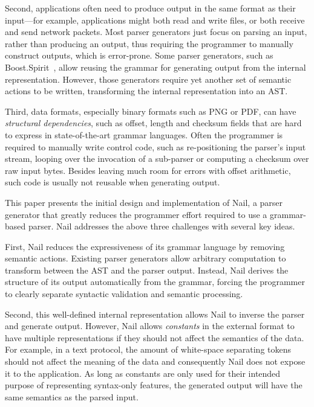 Second,  applications often need to produce output in the same
format as their input---for example, applications might both
read and write files, or both receive and send network packets.
Most parser generators just focus on parsing an input, rather
than producing an output, thus requiring the programmer to manually
construct outputs, which is error-prone.  Some parser generators, such as
Boost.Spirit~\cite{boost-spirit},
allow reusing the grammar for generating output from the internal
representation.  However, those generators require yet another set of
semantic actions to be written, transforming the internal representation
into an AST\@.


Third, data formats, especially binary formats such as PNG or PDF, can have \emph{structural dependencies}, such as offset, length and checksum fields
that are hard to express in state-of-the-art grammar languages. Often the programmer is required to
manually write control code, such as re-positioning the parser's input stream, looping over the
invocation of a sub-parser or computing a
checksum over raw input bytes.  Besides leaving much room for errors with offset arithmetic, such
code is usually not reusable when generating output.


This paper presents the initial design and implementation of Nail, a parser
generator that greatly reduces the programmer effort required to use a
grammar-based parser. Nail addresses the above three challenges with several key
ideas.

First, Nail reduces the expressiveness of its grammar language by removing
semantic actions. Existing parser generators allow arbitrary computation to
transform between the AST and the parser output. Instead, Nail derives the
structure of its output automatically from the grammar, forcing the programmer
to clearly separate syntactic validation and semantic processing.

Second, this well-defined internal representation allows Nail to inverse the
parser and generate output. However, Nail allows \emph{constants} in the
external format to have multiple representations if they should not affect the
semantics of the data. For example, in a text protocol, the amount of
white-space separating tokens should not affect the meaning of the data and
consequently Nail does not expose it to the application. As long as
constants are only used for their intended purpose of representing syntax-only
features, the generated output will have the same semantics as the parsed input.

